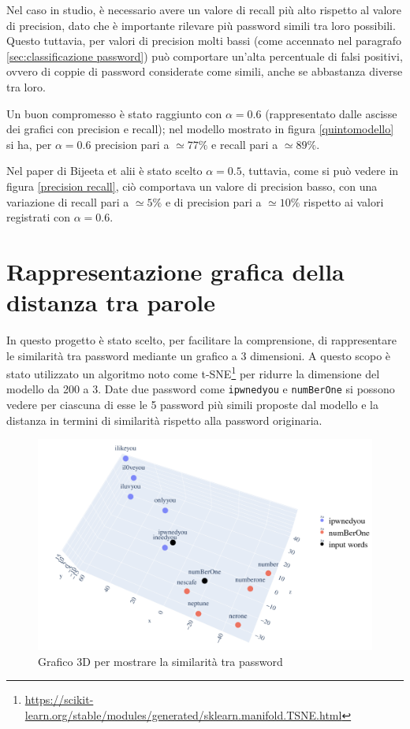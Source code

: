Nel caso in studio, è necessario avere un valore di recall più alto rispetto al valore di precision, dato che è importante rilevare più password simili tra loro possibili. Questo tuttavia, per valori di precision molti bassi (come accennato nel paragrafo \ref{sec:classificazione password}) può comportare un'alta percentuale di falsi positivi, ovvero di coppie di password considerate come simili, anche se abbastanza diverse tra loro.

Un buon compromesso è stato raggiunto con $\alpha = 0.6$ (rappresentato dalle ascisse dei grafici con precision e recall); nel modello mostrato in figura \ref{quintomodello} si ha, per $\alpha = 0.6$ precision pari a $\simeq 77\%$ e recall pari a $\simeq 89\%$.

Nel paper di Bijeeta et alii \cite{bijeeta} è stato scelto $\alpha = 0.5$, tuttavia, come si può vedere in figura \ref{precision recall}, ciò comportava un valore di precision basso, con una variazione di recall pari a $\simeq 5\%$ e di precision pari a $\simeq 10\%$ rispetto ai valori registrati con $\alpha = 0.6$.
\section{Rappresentazione grafica della distanza tra parole}
\label{sec:rappresentazione grafica distanza tra parole}
In questo progetto è stato scelto, per facilitare la comprensione, di rappresentare le similarità tra password mediante un grafico a 3 dimensioni. A questo scopo è stato utilizzato un algoritmo noto come t-SNE\footnote{\url{https://scikit-learn.org/stable/modules/generated/sklearn.manifold.TSNE.html}} per ridurre la dimensione del modello da 200 a 3.
Date due password come \texttt{ipwnedyou} e \texttt{numBerOne} si possono vedere per ciascuna di esse le 5 password più simili proposte dal modello e la distanza in termini di similarità rispetto alla password originaria.
\begin{figure}[H]
    \centering
    \includegraphics[width=15cm]{./immagini/3dplot.png}
    \caption{Grafico 3D per mostrare la similarità tra password}
    \label{3d}
\end{figure}
